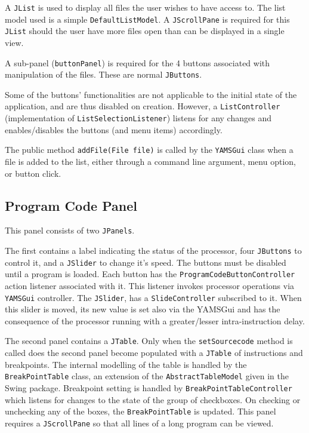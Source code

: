 A {\tt JList} is used to display all files the user wishes to have access to. The list model used is a simple {\tt DefaultListModel}. A {\tt JScrollPane} is required for this {\tt JList} should the user have more files open than can be displayed in a single view.

A sub-panel ({\tt buttonPanel}) is required for the 4 buttons associated with manipulation of the files. These are normal {\tt JButtons}.

Some of the buttons' functionalities are not applicable to the initial state of the application, and are thus disabled on creation. However, a {\tt ListController} (implementation of {\tt ListSelectionListener}) listens for any changes and enables/disables the buttons (and menu items) accordingly.

The public method {\tt addFile(File file)} is called by the {\tt YAMSGui} class when a file is added to the list, either through a command line argument, menu option, or button click.



\subsection{Program Code Panel}

This panel consists of two {\tt JPanels}.

The first contains a label indicating the status of the processor, four {\tt JButtons} to control it, and a {\tt JSlider} to change it's speed. The buttons must be disabled until a program is loaded. Each button has the {\tt ProgramCodeButtonController} action listener associated with it. This listener invokes processor operations via {\tt YAMSGui} controller. The {\tt JSlider}, has a {\tt SlideController} subscribed to it. When this slider is moved, its new value is set also via the YAMSGui and has the consequence of the processor running with a greater/lesser intra-instruction delay.

The second panel contains a {\tt JTable}. Only when the {\tt setSourcecode} method is called does the second panel become populated with a {\tt JTable} of instructions and breakpoints. The internal modelling of the table is handled by the {\tt BreakPointTable} class, an extension of the {\tt AbstractTableModel} given in the Swing package. Breakpoint setting is handled by {\tt BreakPointTableController} which listens for changes to the state of the group of checkboxes. On checking or unchecking any of the boxes, the {\tt BreakPointTable} is updated. This  panel requires a {\tt JScrollPane} so that all lines of a long program can be viewed.



